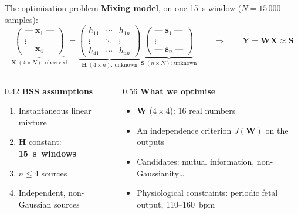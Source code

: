 \documentclass{beamer}
\begin{document}
\begin{frame}{The optimisation problem}
  \small
  \textbf{Mixing model}, on one 15~s window ($N = 15\,000$ samples):
  {\footnotesize\[
    \underbrace{\begin{pmatrix} \text{---}\; \mathbf{x}_1 \;\text{---} \\ \vdots \\ \text{---}\; \mathbf{x}_4 \;\text{---} \end{pmatrix}}_{\mathbf{X}\ (4 \times N)\text{: observed}}
    =
    \underbrace{\begin{pmatrix} h_{11} & \cdots & h_{1n} \\ \vdots & \ddots & \vdots \\ h_{41} & \cdots & h_{4n} \end{pmatrix}}_{\mathbf{H}\ (4 \times n)\text{: unknown}}
    \underbrace{\begin{pmatrix} \text{---}\; \mathbf{s}_1 \;\text{---} \\ \vdots \\ \text{---}\; \mathbf{s}_n \;\text{---} \end{pmatrix}}_{\mathbf{S}\ (n \times N)\text{: unknown}}
    \qquad\Longrightarrow\qquad
    \mathbf{Y} = \mathbf{W}\mathbf{X} \approx \mathbf{S}
  \]}
  \begin{columns}[T]
    \begin{column}{0.42\textwidth}
      \textbf{BSS assumptions}
      \begin{enumerate}
        \item Instantaneous linear mixture
        \item $\mathbf{H}$ constant: \mbox{\textbf{15~s windows}}
        \item $n \le 4$ sources
        \item Independent, non-Gaussian sources
      \end{enumerate}
    \end{column}
    \begin{column}{0.56\textwidth}
      \textbf{What we optimise}
      \begin{itemize}
        \item $\mathbf{W}$ ($4 \times 4$): 16 real numbers
        \item An independence criterion $J(\mathbf{W})$ on the outputs
        \item Candidates: mutual information, non-Gaussianity\ldots
        \item Physiological constraints: periodic fetal output, 110--160~bpm
      \end{itemize}
    \end{column}
  \end{columns}
\end{frame}
\end{document}
